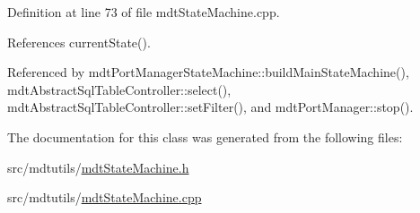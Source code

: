 Definition at line 73 of file mdt\-State\-Machine.\-cpp.



References current\-State().



Referenced by mdt\-Port\-Manager\-State\-Machine\-::build\-Main\-State\-Machine(), mdt\-Abstract\-Sql\-Table\-Controller\-::select(), mdt\-Abstract\-Sql\-Table\-Controller\-::set\-Filter(), and mdt\-Port\-Manager\-::stop().



The documentation for this class was generated from the following files\-:\begin{DoxyCompactItemize}
\item 
src/mdtutils/\hyperlink{mdt_state_machine_8h}{mdt\-State\-Machine.\-h}\item 
src/mdtutils/\hyperlink{mdt_state_machine_8cpp}{mdt\-State\-Machine.\-cpp}\end{DoxyCompactItemize}
